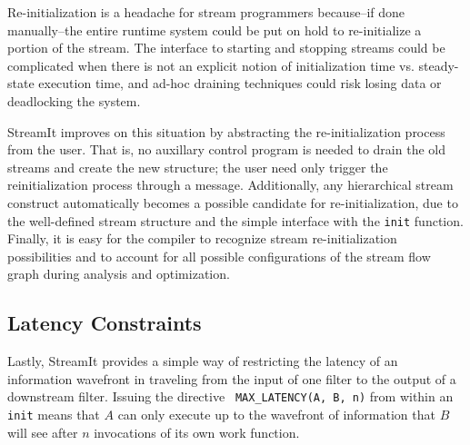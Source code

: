 Re-initialization is a headache for stream programmers because--if
done manually--the entire runtime system could be put on hold to
re-initialize a portion of the stream.  The interface to starting and
stopping streams could be complicated when there is not an explicit
notion of initialization time vs. steady-state execution time, and
ad-hoc draining techniques could risk losing data or deadlocking the
system.

StreamIt improves on this situation by abstracting the
re-initialization process from the user.  That is, no auxillary
control program is needed to drain the old streams and create the new
structure; the user need only trigger the reinitialization process
through a message.  Additionally, any hierarchical stream construct
automatically becomes a possible candidate for re-initialization, due
to the well-defined stream structure and the simple interface with the
{\tt init} function.  Finally, it is easy for the compiler to
recognize stream re-initialization possibilities and to account for
all possible configurations of the stream flow graph during analysis
and optimization.

\subsection{Latency Constraints}

Lastly, StreamIt provides a simple way of restricting the latency of
an information wavefront in traveling from the input of one filter to
the output of a downstream filter.  Issuing the directive {\tt
MAX\_LATENCY(A, B, n)} from within an {\tt init} means that $A$ can
only execute up to the wavefront of information that $B$ will see
after $n$ invocations of its own work function.



